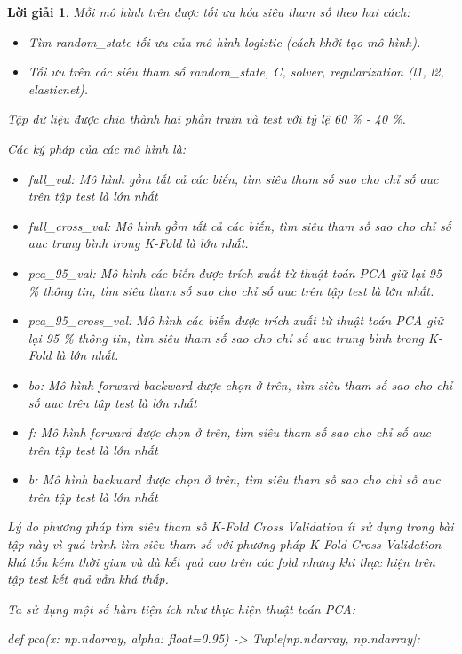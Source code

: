 \documentclass[14pt, a4paper]{article}
\theoremstyle{sltheorem}
\theoremstyle{soltheorem}
\newtheorem*{loigiai}{Lời giải}
\begin{document}
\begin{loigiai}
    Mỗi mô hình trên được tối ưu hóa siêu tham số theo hai cách:

    \begin{itemize}
        \item Tìm random\_state tối ưu của mô hình logistic (cách khởi tạo mô hình).
        \item Tối ưu trên các siêu tham số random\_state, C, solver, regularization (l1, l2, elasticnet).
    \end{itemize}

    Tập dữ liệu được chia thành hai phần train và test với tỷ lệ 60 \% - 40 \%.
    
    Các ký pháp của các mô hình là:

    \begin{itemize}
        \item full\_val: Mô hình gồm tất cả các biến, tìm siêu tham số sao cho chỉ số auc trên tập test là lớn nhất
        \item full\_cross\_val: Mô hình gồm tất cả các biến, tìm siêu tham số sao cho chỉ số auc trung bình trong K-Fold là lớn nhất.
        \item pca\_95\_val: Mô hình các biến được trích xuất từ thuật toán PCA giữ lại 95 \% thông tin, tìm siêu tham số sao cho chỉ số auc trên tập test là lớn nhất.
        \item pca\_95\_cross\_val: Mô hình các biến được trích xuất từ thuật toán PCA giữ lại 95 \% thông tin, tìm siêu tham số sao cho chỉ số auc trung bình trong K-Fold là lớn nhất.
        \item bo: Mô hình forward-backward được chọn ở trên, tìm siêu tham số sao cho chỉ số auc trên tập test là lớn nhất
        \item f: Mô hình forward được chọn ở trên, tìm siêu tham số sao cho chỉ số auc trên tập test là lớn nhất
        \item b: Mô hình backward được chọn ở trên, tìm siêu tham số sao cho chỉ số auc trên tập test là lớn nhất
    \end{itemize}

    Lý do phương pháp tìm siêu tham số K-Fold Cross Validation ít sử dụng trong bài tập này vì quá trình tìm siêu tham số với phương pháp K-Fold Cross Validation khá tốn kém thời gian và dù kết quả cao trên các fold nhưng khi thực hiện trên tập test kết quả vẫn khá thấp.

    Ta sử dụng một số hàm tiện ích như thực hiện thuật toán PCA:

    \begin{python}
def pca(x: np.ndarray, alpha: float=0.95) -> Tuple[np.ndarray, np.ndarray]:
    

\end{python}
\end{loigiai}
\end{document}
